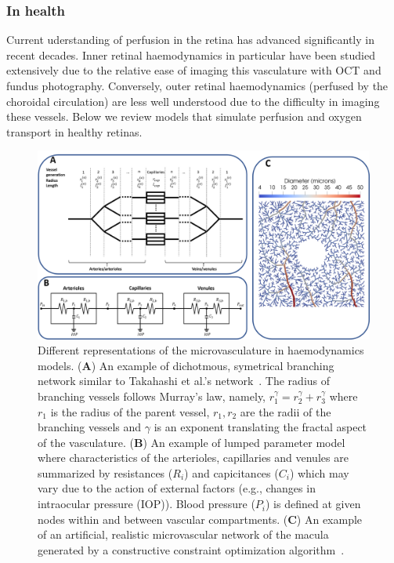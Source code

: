 \documentclass{article}
\begin{document}
\subsubsection{In health}

Current uderstanding of perfusion in the retina has advanced significantly in recent decades.
Inner retinal haemodynamics in particular have been studied extensively due to the relative ease of imaging this vasculature with OCT and fundus photography.
Conversely, outer retinal haemodynamics (perfused by the choroidal circulation) are less well understood due to the difficulty in imaging these vessels.
Below we review models that simulate perfusion and oxygen transport in healthy retinas.

\begin{figure}[t!]
  \centering
  \includegraphics[width=\textwidth]{NetworkModels}
  \caption{Different representations of the microvasculature in haemodynamics models. (\textbf A) An example of dichotmous, symetrical branching network similar to Takahashi et al.'s network~\cite{Takahashi_2009}. The radius of branching vessels follows Murray's law, namely, $r_1^\gamma = r_2^\gamma+r_3^\gamma$ where $r_1$ is the radius of the parent vessel, $r_1,r_2$ are the radii of the branching vessels and $\gamma$ is an exponent translating the fractal aspect of the vasculature. (\textbf{B}) An example of lumped parameter model where characteristics of the arterioles, capillaries and venules are summarized by resistances ($R_i$) and capicitances ($C_i$) which may vary due to the action of external factors (e.g., changes in intraocular pressure (IOP)). Blood pressure ($P_i$) is defined at given nodes within and between vascular compartments. (\textbf{C}) An example of an artificial, realistic microvascular network of the macula generated by a constructive constraint optimization algorithm~\cite{Talou_2021}.}
  \label{fig:NetworkModels}
\end{figure}
\end{document}
